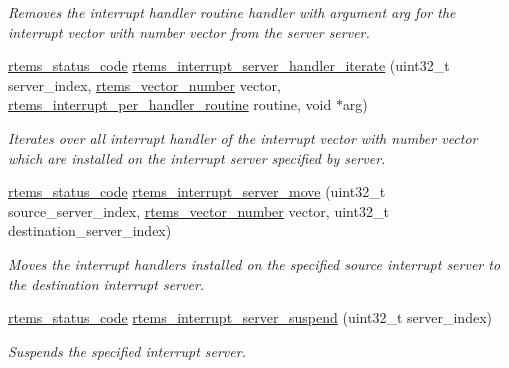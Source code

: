 \begin{DoxyCompactItemize}
\begin{DoxyCompactList}\small\item\em Removes the interrupt handler routine {\itshape handler} with argument {\itshape arg} for the interrupt vector with number {\itshape vector} from the server {\itshape server}. \end{DoxyCompactList}\item 
\mbox{\hyperlink{group__ClassicStatus_ga545d41846817eaba6143d52ee4d9e9fe}{rtems\+\_\+status\+\_\+code}} \mbox{\hyperlink{group__rtems__interrupt__extension_ga0a4f6995bde02b055963ae8d399c33d7}{rtems\+\_\+interrupt\+\_\+server\+\_\+handler\+\_\+iterate}} (uint32\+\_\+t server\+\_\+index, \mbox{\hyperlink{group__ClassicINTR_ga3e434c197d99f128e78cae4d9358bd8b}{rtems\+\_\+vector\+\_\+number}} vector, \mbox{\hyperlink{group__rtems__interrupt__extension_gad3e88a9acfac97a5021ff98471f5cd71}{rtems\+\_\+interrupt\+\_\+per\+\_\+handler\+\_\+routine}} routine, void $\ast$arg)
\begin{DoxyCompactList}\small\item\em Iterates over all interrupt handler of the interrupt vector with number {\itshape vector} which are installed on the interrupt server specified by {\itshape server}. \end{DoxyCompactList}\item 
\mbox{\hyperlink{group__ClassicStatus_ga545d41846817eaba6143d52ee4d9e9fe}{rtems\+\_\+status\+\_\+code}} \mbox{\hyperlink{group__rtems__interrupt__extension_gaea09674f8f28aacbaad076e1e31dcdad}{rtems\+\_\+interrupt\+\_\+server\+\_\+move}} (uint32\+\_\+t source\+\_\+server\+\_\+index, \mbox{\hyperlink{group__ClassicINTR_ga3e434c197d99f128e78cae4d9358bd8b}{rtems\+\_\+vector\+\_\+number}} vector, uint32\+\_\+t destination\+\_\+server\+\_\+index)
\begin{DoxyCompactList}\small\item\em Moves the interrupt handlers installed on the specified source interrupt server to the destination interrupt server. \end{DoxyCompactList}\item 
\mbox{\hyperlink{group__ClassicStatus_ga545d41846817eaba6143d52ee4d9e9fe}{rtems\+\_\+status\+\_\+code}} \mbox{\hyperlink{group__rtems__interrupt__extension_gab2a38f81f4b810d943c86e548104fc4f}{rtems\+\_\+interrupt\+\_\+server\+\_\+suspend}} (uint32\+\_\+t server\+\_\+index)
\begin{DoxyCompactList}\small\item\em Suspends the specified interrupt server. \end{DoxyCompactList}\item 

\end{DoxyCompactItemize}
